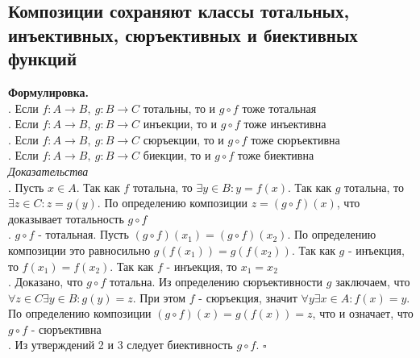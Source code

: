\documentclass[a4paper]{article}
\newcommand{\qed}{\hfill$\square$}
\begin{document}
\subsection{Композиции сохраняют классы тотальных, инъективных, сюръективных и биективных функций}
\label{sec:2.7}\textbf{Формулировка.}\\[2mm]
. Если $f: A\rightarrow B,\ g: B\rightarrow C$ тотальны, то и $g\circ f$ тоже тотальная\\[2mm] 
. Если $f: A\rightarrow B,\ g: B\rightarrow C$ инъекции, то и $g\circ f$ тоже инъективна\\[2mm]
. Если $f: A\rightarrow B,\ g: B\rightarrow C$ сюръекции, то и $g\circ f$ тоже сюръективна\\[2mm]
. Если $f: A\rightarrow B,\ g: B\rightarrow C$ биекции, то и $g\circ f$ тоже биективна\\[2mm]
\textit{Доказательства}\\[2mm]
. Пусть $x\in A$. Так как $f$ тотальна, то $\exists y\in B: y=f(x)$. Так как $g$ тотальна, то $\exists z\in C: z=g(y)$. По определению композиции $z=(g\circ f)(x)$, что доказывает тотальность $g\circ f$\\[2mm]
. $g\circ f$ - тотальная. Пусть $(g\circ f)(x_1)=(g\circ f)(x_2)$. По определению композиции это равносильно $g(f(x_1))=g(f(x_2))$. Так как $g$ - инъекция, то $f(x_1)=f(x_2)$. Так как $f$ - инъекция, то $x_1=x_2$\\[2mm]
. Доказано, что $g\circ f$ тотальна. Из определению сюръективности $g$ заключаем, что $\forall z\in C\exists y\in B: g(y)=z$. При этом $f$ - сюръекция, значит $\forall y\exists x\in A: f(x)=y$. По определению композиции $(g\circ f)(x)=g(f(x))=z$, что и означает, что $g\circ f$ - сюръективна\\[2mm]
. Из утверждений 2 и 3 следует биективность $g\circ f$. \qed
\end{document}
